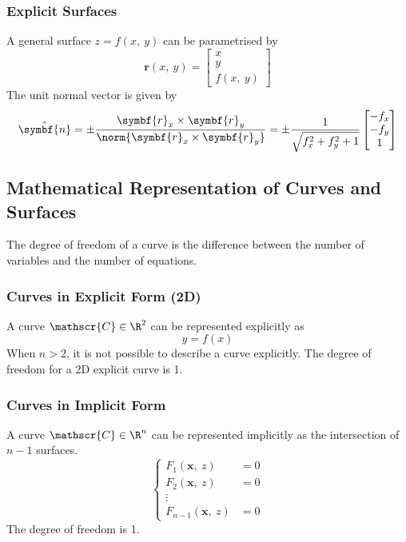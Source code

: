 \documentclass{article}
\begin{document}
\subsubsection{Explicit Surfaces}
A general surface \(z = f\left( x,\: y \right)\) can be parametrised by
\begin{equation*}
    \symbf{r}\left( x,\: y \right) =
    \begin{bmatrix}
        x \\
        y \\
        f\left( x,\: y \right)
    \end{bmatrix}
\end{equation*}
The unit normal vector is given by
\begin{equation*}
    \hat{\symbf{n}} = \pm \frac{\symbf{r}_x \times \symbf{r}_y}{\norm{\symbf{r}_x \times \symbf{r}_y}} =
    \pm \frac{1}{\sqrt{f_x^2 + f_y^2 + 1}}
    \begin{bmatrix}
        -f_x \\
        -f_y \\
        1
    \end{bmatrix}
\end{equation*}
\subsection{Mathematical Representation of Curves and Surfaces}
\begin{definition}
    The degree of freedom of a curve is the difference between the
    number of variables and the number of equations.
\end{definition}
\subsubsection{Curves in Explicit Form (2D)}
A curve \(\mathscr{C} \in \R^2\) can be represented explicitly as
\begin{equation*}
    y = f\left( x \right)
\end{equation*}
When \(n > 2\), it is not possible to describe a curve explicitly.
The degree of freedom for a 2D explicit curve is 1.
\subsubsection{Curves in Implicit Form}
A curve \(\mathscr{C} \in \R^n\) can be represented implicitly as the
intersection of \(n - 1\) surfaces.
\begin{equation*}
    \left\{
    \begin{aligned}
        F_1\left( \symbf{x},\: z \right)       & = 0 \\
        F_2\left( \symbf{x},\: z \right)       & = 0 \\
        \vdots                                 &     \\
        F_{n - 1}\left( \symbf{x},\: z \right) & = 0
    \end{aligned}
    \right.
\end{equation*}
The degree of freedom is 1.
\end{document}
